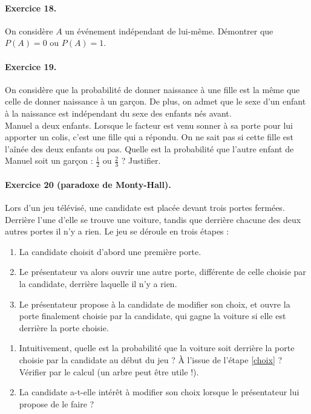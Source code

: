 \documentclass[11pt]{article}
\begin{document}
\paragraph{Exercice 18.} On considère $A$ un événement indépendant de 
lui-même. Démontrer que $P(A)=0$ ou $P(A)=1$.

\paragraph{Exercice 19.} On considère que la probabilité de donner naissance à
une fille est la même que celle de donner naissance à un garçon. De plus, on
admet que le sexe d'un enfant à la naissance est indépendant du sexe des enfants
nés avant.\\
Manuel a deux enfants. Lorsque le facteur est venu sonner à sa porte pour lui
apporter un colis, c'est une fille qui a répondu. On ne sait pas si cette fille
est l'aînée des deux enfants ou pas. Quelle est la probabilité que l'autre
enfant de Manuel soit un garçon : $\frac{1}{2}$ ou $\frac{2}{3}$ ? Justifier.

\paragraph{Exercice 20 (paradoxe de Monty-Hall).} Lors d'un jeu télévisé, une
candidate est placée devant trois portes fermées. Derrière l'une d'elle se trouve
une voiture, tandis que derrière chacune des deux autres portes il n'y a rien.
Le jeu se déroule en trois étapes :
\begin{enumerate}[label=(\alph*)]
  \item La candidate choisit d'abord une première porte.
  \item\label{choix} Le présentateur va alors ouvrir une autre porte, différente de celle
    choisie par la candidate, derrière laquelle il n'y a rien.
  \item Le présentateur propose à la candidate de modifier son choix, et ouvre
    la porte finalement choisie par la candidate, qui gagne la voiture si elle
    est derrière la porte choisie.
\end{enumerate}
\begin{enumerate}
  \item Intuitivement, quelle est la probabilité que la voiture soit derrière la
    porte choisie par la candidate au début du jeu ? À l'issue de l'étape
    \ref{choix} ? Vérifier par le calcul (un arbre peut être utile !).
  \item La candidate a-t-elle intérêt à modifier son choix lorsque le présentateur lui
propose de le faire ?
\end{enumerate}
\end{document}
